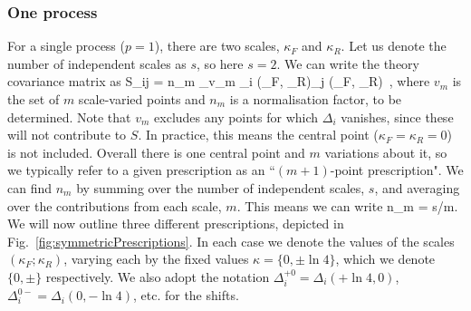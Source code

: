 \subsubsection{One process}
For a single process ($p=1$), there are two scales, $\kappa_F$ and $\kappa_R$. Let us denote the number of independent scales as $s$, so here $s=2$. We can write the theory covariance matrix as
\be 
  S_{ij} = n_{m} \sum_{v_{m}} \Delta_{i} (\kappa_F, \kappa_R)\Delta_{j} (\kappa_F, \kappa_R)\, ,
\ee
where $v_m$ is the set of $m$ scale-varied points and $n_m$ is a normalisation factor, to be determined. Note that $v_m$ excludes any points for which $\Delta_i$ vanishes, since these will not contribute to $S$. In practice, this means the central point ($\kappa_F = \kappa_R = 0$) is not included. Overall there is one central point and $m$ variations about it, so we typically refer to a given prescription as an ``$(m+1)$-point prescription". We can find $n_m$ by summing over the number of independent scales, $s$, and averaging over the contributions from each scale, $m$. This means we can write
\be
n_m = s/m.
\ee
We will now outline three different prescriptions, depicted in Fig.~\ref{fig:symmetricPrescriptions}. In each case we denote the values of the scales $(\kappa_F; \kappa_R)$, varying each by the fixed values $\kappa = \{0, \pm \ln 4\}$, which we denote $\{0, \pm\}$ respectively. We also adopt the notation $\Delta_i^{+0}=\Delta_i(+\ln 4,0)$, $\Delta_i^{0-}=\Delta_i(0,-\ln4 )$, etc. for the shifts.
